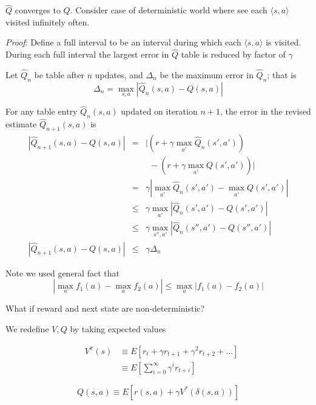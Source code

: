 \newpage
$\hat{Q}$ converges to $Q$.  Consider case of deterministic world where see
each $\langle s,a \rangle$ visited infinitely often.

\bigskip
{\em Proof}: Define a full interval to be an interval during which each
$\langle s, a \rangle$ is visited.  During each full interval the largest
error in $\hat{Q}$ table is reduced by factor of $\gamma$

\bigskip

 Let $\hat{Q}_{n}$ be table after $n$ updates, and $\Delta_{n}$ be the maximum
error in $\hat{Q}_{n}$; that is 
\[\Delta_{n} = \max_{s,a} |\hat{Q}_{n}(s,a) - Q(s,a)| \]

\bigskip
For any table entry $\hat{Q}_{n}(s,a)$ updated on iteration $n+1$, the error
in the revised estimate $\hat{Q}_{n+1}(s,a)$ is
\begin{eqnarray}
|\hat{Q}_{n+1}(s,a) - Q(s,a)| & = & | (r + \gamma \max_{a'}\hat{Q}_{n}(s',a')) \nonumber\\
 & & \ \  - (r + \gamma \max_{a'}Q(s',a')) | \nonumber \\
 & = & \gamma | \max_{a'}\hat{Q}_{n}(s',a') - \max_{a'}Q(s',a') | \nonumber\\
 & \leq & \gamma \max_{a'} | \hat{Q}_{n}(s',a') - Q(s',a') | \nonumber \\
 & \leq & \gamma \max_{s'',a'} | \hat{Q}_{n}(s'',a') - Q(s'',a') | \nonumber \\
|\hat{Q}_{n+1}(s,a) - Q(s,a)| & \leq & \gamma \Delta_{n} \nonumber
\end{eqnarray}

\bigskip
Note we used general fact that
\[|\max_{a}f_{1}(a) - \max_{a}f_{2}(a)| \leq \max_{a} |f_{1}(a)-f_{2}(a)|\]


 \bk

What if reward and next state are non-deterministic?

\bigskip

We redefine $V, Q$ by taking expected values

\begin{eqnarray}
 & V^{\pi}(s) & \equiv E[ r_{t} + \gamma r_{t+1} + \gamma^{2} r_{t+2} + \ldots
 ]
\nonumber \\ 
& & \equiv E [ \sum_{i=0}^{\infty} \gamma^{i} r_{t+i} ] \nonumber
\end{eqnarray}


\[ Q(s,a) \equiv E[r(s,a) + \gamma V^{*}(\delta(s,a)) ] \]

 \bk

